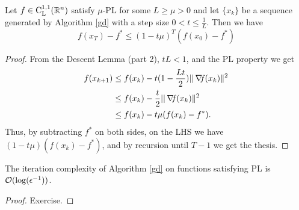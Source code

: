 \documentclass[10pt,a4paper]{article}
\begin{document}
\begin{theorem}\label{thm:pl_convergence}
	Let $f\in \mathord{\mathrm{C^{1,1}_{L}}}(\mathbb{R}^n)$ satisfy $\mu$-PL for some $L\geq \mu >0$ and let $\{x_k\}$ be a sequence generated by Algorithm \ref{gd} with a step size $0<t\leq\frac{1}{L}$. Then we have 
	\begin{equation}\label{eq:pl_convergence}
		f(x_T)-f^*\leq (1-t\mu)^T(f(x_0)-f^*)
	\end{equation}
\end{theorem}
\begin{proof}
	From the Descent Lemma (part 2), $tL<1$, and the PL property we get 
	\begin{align*}
			f(x_{k+1}) &\leq f(x_k) - t(1-\frac{Lt}{2})||\operatorname*{\mathit{\nabla \!f}}(x_k)\|^2\\
			& \leq f(x_k) -\frac{t}{2}||\operatorname*{\mathit{\nabla \!f}}(x_k)\|^2\\
			& \leq f(x_k) - t\mu (f(x_k)-f^*).
	\end{align*}
Thus, by subtracting $f^*$ on both sides, on the LHS we have $(1-t\mu)(f(x_k)-f^*)$, and by recursion until $T-1$ we get the thesis.
\end{proof}
\begin{corollary}
The iteration complexity of Algorithm \eqref{gd} on functions satisfying PL is $\mathcal{O}(\log(\epsilon^{-1}))$.
\end{corollary}
\begin{proof}
Exercise.
\end{proof}
\end{document}
